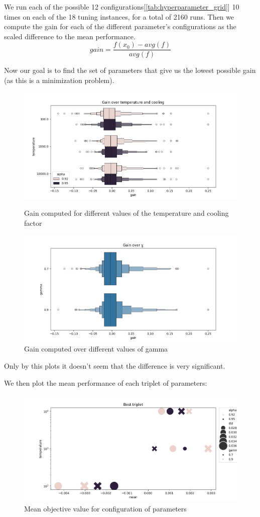 \documentclass[a4paper,12pt]{article}
\begin{document}
We run each of the possible 12 configurations[\ref{tab:hyperparameter_grid}] 10 times on each of the 18 tuning instances, for a total of 2160 runs.
Then we compute the gain for each of the different parameter's configurations as the scaled difference to the mean performance.
$$gain = \frac{f(x_0) - avg(f)}{avg(f)}$$

Now our goal is to find the set of parameters that give us the lowest possible gain (as this is a minimization problem).

\begin{figure}[H]
    \centering
    \includegraphics[width=0.8\linewidth]{graphics/Temperature.png}
    \caption{Gain computed for different values of the temperature and cooling factor}
    \includegraphics[width=0.8\linewidth]{graphics/gamma.png}
    \caption{Gain computed over different values of gamma}
    \label{fig:enter-label}
\end{figure}

Only by this plots it doesn't seem that the difference is very significant.

We then plot the mean performance of each triplet of parameters:
\begin{figure}[H]
    \centering
    \includegraphics[width=0.9\linewidth]{graphics/best_params.png}
    \caption{Mean objective value for configuration of parameters}
    \label{fig:enter-label}
\end{figure}
\end{document}
